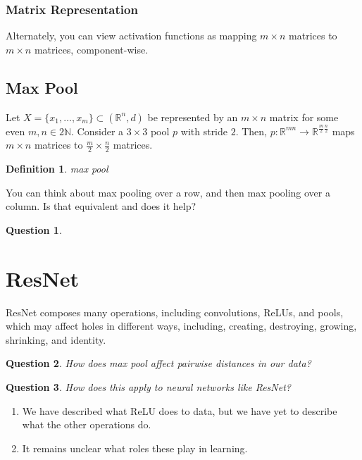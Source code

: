 \documentclass{article}
\newtheorem{definition}{Definition}
\newtheorem{question}{Question}
\newcommand{\N}{\mathbb{N}}
\newcommand{\R}{\mathbb{R}}
\begin{document}
\subsubsection{Matrix Representation}
Alternately, you can view activation functions as mapping $m\times n$ matrices to $m\times n$ matrices, component-wise.

\subsection{Max Pool}\label{sec:pool}
Let $X=\{x_1,\dots,x_m\}\subset(\R^n,d)$ be represented by an $m\times n$ matrix for some even $m,n\in 2\N$.
Consider a $3\times 3$ pool $p$ with stride $2$.
Then, $p:\R^{mn}\to\R^{\frac{m}{2}\frac{n}{2}}$ maps $m\times n$ matrices to $\frac{m}{2}\times\frac{n}{2}$ matrices.
\begin{definition}
max pool
\end{definition}
You can think about max pooling over a row, and then max pooling over a column. Is that equivalent and does it help?
\begin{question}

\end{question}


\section{ResNet}\label{sec:result}
ResNet composes many operations, including convolutions, ReLUs, and pools, which may affect holes in different ways, including, creating, destroying, growing, shrinking, and identity. 

\begin{question}
How does max pool affect pairwise distances in our data?
\end{question}

\begin{question}
How does this apply to neural networks like ResNet?
\end{question}
\begin{enumerate}
\item We have described what ReLU does to data, but we have yet to describe what the other operations do.
\item It remains unclear what roles these play in learning.
\end{enumerate}


\end{document}
